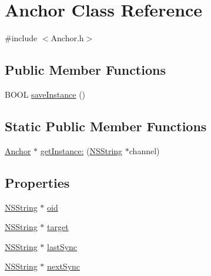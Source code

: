 \hypertarget{interface_anchor}{
\section{\-Anchor \-Class \-Reference}
\label{interface_anchor}
}


{\ttfamily \#include $<$\-Anchor.\-h$>$}

\subsection*{\-Public \-Member \-Functions}
\begin{DoxyCompactItemize}
\item 
\-B\-O\-O\-L \hyperlink{interface_anchor_ad2bf14b4497dfe40d32b39bbb703b4ba}{save\-Instance} ()
\end{DoxyCompactItemize}
\subsection*{\-Static \-Public \-Member \-Functions}
\begin{DoxyCompactItemize}
\item 
\hyperlink{interface_anchor}{\-Anchor} $\ast$ \hyperlink{interface_anchor_acb4b964f52492842c7c2eccbeccbe97d}{get\-Instance\-:} (\hyperlink{class_n_s_string}{\-N\-S\-String} $\ast$channel)
\end{DoxyCompactItemize}
\subsection*{\-Properties}
\begin{DoxyCompactItemize}
\item 
\hyperlink{class_n_s_string}{\-N\-S\-String} $\ast$ \hyperlink{interface_anchor_a0a09df47300a690cff7d8b1df88fd524}{oid}
\item 
\hyperlink{class_n_s_string}{\-N\-S\-String} $\ast$ \hyperlink{interface_anchor_a67abb3f4400fc8ea6748865a40576336}{target}
\item 
\hyperlink{class_n_s_string}{\-N\-S\-String} $\ast$ \hyperlink{interface_anchor_a00a078ac73a370cf682b07cd08a8cea6}{last\-Sync}
\item 
\hyperlink{class_n_s_string}{\-N\-S\-String} $\ast$ \hyperlink{interface_anchor_ae6ce31caccba0d8974f14e5bea2525fa}{next\-Sync}
\end{DoxyCompactItemize}


